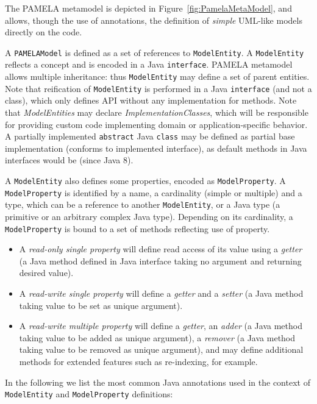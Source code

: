 The PAMELA metamodel is depicted in Figure~\ref{fig:PamelaMetaModel}, and allows, though the use of annotations, the definition of \emph{simple} UML-like models directly on the code.

A \texttt{PAMELAModel} is defined as a set of references to \texttt{ModelEntity}. A \texttt{ModelEntity} reflects a concept and is encoded in a Java \texttt{interface}. PAMELA metamodel allows multiple inheritance: thus \texttt{ModelEntity} may define a set of parent entities. Note that reification of \texttt{ModelEntity} is performed in a Java \texttt{interface} (and not a class), which only defines API without any implementation for methods. 
Note that \emph{ModelEntities} may declare \emph{ImplementationClasses}, which
will be responsible for providing custom code implementing domain or
application-specific behavior. A partially implemented \texttt{abstract} Java
\texttt{class} may be defined as partial base implementation (conforms to
implemented interface), as default methods in Java interfaces would be
(since Java 8).

A \texttt{ModelEntity} also defines some properties, encoded as \texttt{ModelProperty}. A \texttt{ModelProperty} is identified by a name, a cardinality (simple or multiple) and a type, which can be a reference to another \texttt{ModelEntity}, or a Java type (a primitive or an arbitrary complex Java type). Depending on its cardinality, a \texttt{ModelProperty} is bound to a set of methods reflecting use of property.
\begin{itemize}
    \item A \emph{read-only single property} will define read access of its value using a \emph{getter} (a Java method defined in Java interface taking no argument and returning desired value).
    \item A \emph{read-write single property} will define a \emph{getter} and a \emph{setter} (a Java method taking value to be set as unique argument).
    \item A \emph{read-write multiple property} will define a \emph{getter}, an \emph{adder} (a Java method taking value to be added as unique argument), a \emph{remover} (a Java method taking value to be removed as unique argument), and may define additional methods for extended features such as re-indexing, for example.
\end{itemize}


In the following we list the most common Java annotations used in the context of \texttt{ModelEntity} and \texttt{ModelProperty} definitions:

